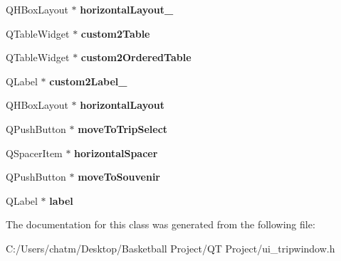\begin{DoxyCompactItemize}
Q\+H\+Box\+Layout $\ast$ {\bfseries horizontal\+Layout\+\_}
\item 
\mbox{\label{class_ui___trip_window_a7325ee2499b4073c16c295849c7a5cb9}} 
Q\+Table\+Widget $\ast$ {\bfseries custom2\+Table}
\item 
\mbox{\label{class_ui___trip_window_a6477553c7221beb84e4850ad470dbcc8}} 
Q\+Table\+Widget $\ast$ {\bfseries custom2\+Ordered\+Table}
\item 
\mbox{\label{class_ui___trip_window_a777c0ac3edd5604b333921b73df8b6eb}} 
Q\+Label $\ast$ {\bfseries custom2\+Label\+\_}
\item 
\mbox{\label{class_ui___trip_window_a3a4444cd145f305c2db38ad2724a7c3c}} 
Q\+H\+Box\+Layout $\ast$ {\bfseries horizontal\+Layout}
\item 
\mbox{\label{class_ui___trip_window_a5408e512bc803caa7494f608918c6f9f}} 
Q\+Push\+Button $\ast$ {\bfseries move\+To\+Trip\+Select}
\item 
\mbox{\label{class_ui___trip_window_af8e02daa9ec2c35a7d4579ec3e2d80d2}} 
Q\+Spacer\+Item $\ast$ {\bfseries horizontal\+Spacer}
\item 
\mbox{\label{class_ui___trip_window_acc67bdcbd402e8a6f205da6a0681cdee}} 
Q\+Push\+Button $\ast$ {\bfseries move\+To\+Souvenir}
\item 
\mbox{\label{class_ui___trip_window_ae6d879d7772ef0de6fceef11837a54e7}} 
Q\+Label $\ast$ {\bfseries label}
\end{DoxyCompactItemize}


The documentation for this class was generated from the following file\+:\begin{DoxyCompactItemize}
\item 
C\+:/\+Users/chatm/\+Desktop/\+Basketball Project/\+Q\+T Project/ui\+\_\+tripwindow.\+h\end{DoxyCompactItemize}

